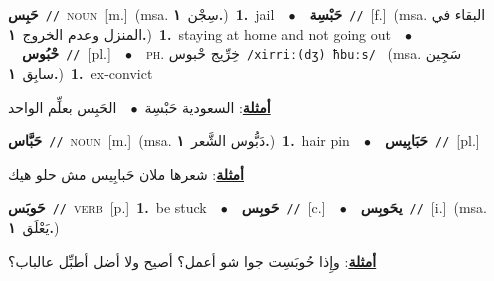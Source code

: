 \documentclass[10pt,a4paper,twoside]{article} %
\begin{document}
\begin{multicols}{2}
{\setlength\topsep{0pt}\textbf{\foreignlanguage{arabic}{حَبِس}}\ {\color{gray}\texttt{//}\color{black}}\ \textsc{noun}\ [m.]\ \color{gray}(msa. \foreignlanguage{arabic}{سِجْن}~\foreignlanguage{arabic}{\textbf{١.}})\color{black}\ \textbf{1.}~jail\ \ $\bullet$\ \ \setlength\topsep{0pt}\textbf{\foreignlanguage{arabic}{حَبْسِة}}\ {\color{gray}\texttt{//}\color{black}}\ [f.]\ \color{gray}(msa. \foreignlanguage{arabic}{البقاء في المنزل وعدم الخروج}~\foreignlanguage{arabic}{\textbf{١.}})\color{black}\ \textbf{1.}~staying at home and not going out\ \ $\bullet$\ \ \setlength\topsep{0pt}\textbf{\foreignlanguage{arabic}{حْبُوس}}\ {\color{gray}\texttt{//}\color{black}}\ [pl.]\ \ $\bullet$\ \ \textsc{ph.} \color{gray} \foreignlanguage{arabic}{خِرِّيج حْبوس}\color{black}\ {\color{gray}\texttt{/{\sffamily xirriː(dʒ) ħbuːs}/}\color{black}}\ \color{gray} (msa. \foreignlanguage{arabic}{سَجِين سابِق}~\foreignlanguage{arabic}{\textbf{١.}})\color{black}\ \textbf{1.}~ex-convict\  \begin{flushright}\color{gray}\foreignlanguage{arabic}{\textbf{\underline{\foreignlanguage{arabic}{أمثلة}}}: السعودية حَبْسِة\ $\bullet$\ \  الحَبِس بعلِّم الواحد}\end{flushright}\color{black}} \vspace{2mm}

{\setlength\topsep{0pt}\textbf{\foreignlanguage{arabic}{حَبَّاس}}\ {\color{gray}\texttt{//}\color{black}}\ \textsc{noun}\ [m.]\ \color{gray}(msa. \foreignlanguage{arabic}{دَبُّوس الشَّعر}~\foreignlanguage{arabic}{\textbf{١.}})\color{black}\ \textbf{1.}~hair pin\ \ $\bullet$\ \ \setlength\topsep{0pt}\textbf{\foreignlanguage{arabic}{حَبَابِيس}}\ {\color{gray}\texttt{//}\color{black}}\ [pl.]\  \begin{flushright}\color{gray}\foreignlanguage{arabic}{\textbf{\underline{\foreignlanguage{arabic}{أمثلة}}}: شعرها ملان حَبابِيس مش حلو هيك}\end{flushright}\color{black}} \vspace{2mm}

{\setlength\topsep{0pt}\textbf{\foreignlanguage{arabic}{حَوبَس}}\ {\color{gray}\texttt{//}\color{black}}\ \textsc{verb}\ [p.]\ \textbf{1.}~be stuck\ \ $\bullet$\ \ \setlength\topsep{0pt}\textbf{\foreignlanguage{arabic}{حَوبِس}}\ {\color{gray}\texttt{//}\color{black}}\ [c.]\ \ $\bullet$\ \ \setlength\topsep{0pt}\textbf{\foreignlanguage{arabic}{يحَوبِس}}\ {\color{gray}\texttt{//}\color{black}}\ [i.]\ \color{gray}(msa. \foreignlanguage{arabic}{يَعْلَق}~\foreignlanguage{arabic}{\textbf{١.}})\color{black}\  \begin{flushright}\color{gray}\foreignlanguage{arabic}{\textbf{\underline{\foreignlanguage{arabic}{أمثلة}}}: وإِذا حُوبَسِت جوا شو أعمل؟ أصيح ولا أضل أطبِّل عالباب؟}\end{flushright}\color{black}} \vspace{2mm}


\end{multicols}
\end{document}
